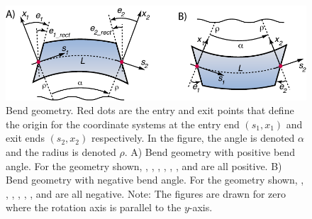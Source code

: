 \begin{figure}[ht]
{\centering 
\includegraphics{bend.pdf} 
\caption[Bend geometry]{
Bend geometry. Red dots are the entry and exit points that define the origin for the
coordinate systems at the entry end $(s_1, x_1)$ and exit ends $(s_2, x_2)$ respectively. 
In the figure, the angle  is denoted $\alpha$ and the radius
 is denoted $\rho$.
A) Bend geometry with positive bend angle. For the geometry shown, 
, , , , , , and  are all positive.
B) Bend geometry with negative bend angle. For the geometry shown, 
, , , , , , and  are all negative.
Note: The figures are drawn for zero  where the rotation axis is parallel to the 
$y$-axis. 
}
\label{f:bend}
}
\end{figure}

